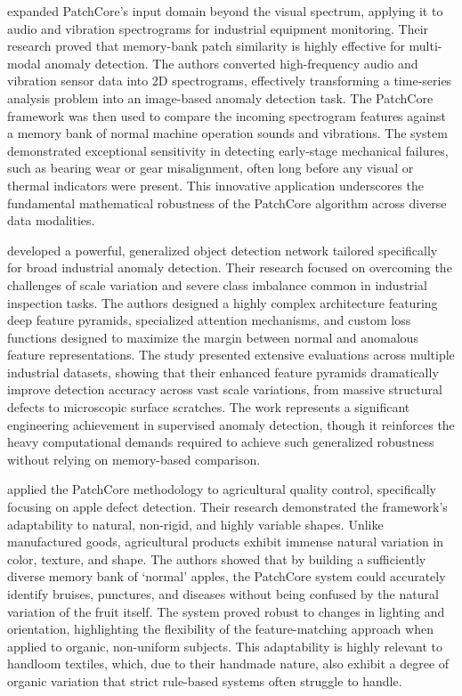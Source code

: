 \documentclass{ieeeaccess}
\begin{document}
\cite{b21} expanded PatchCore's input domain beyond the visual spectrum, applying it to audio and vibration spectrograms for industrial equipment monitoring. Their research proved that memory-bank patch similarity is highly effective for multi-modal anomaly detection. The authors converted high-frequency audio and vibration sensor data into 2D spectrograms, effectively transforming a time-series analysis problem into an image-based anomaly detection task. The PatchCore framework was then used to compare the incoming spectrogram features against a memory bank of normal machine operation sounds and vibrations. The system demonstrated exceptional sensitivity in detecting early-stage mechanical failures, such as bearing wear or gear misalignment, often long before any visual or thermal indicators were present. This innovative application underscores the fundamental mathematical robustness of the PatchCore algorithm across diverse data modalities.

\cite{b22} developed a powerful, generalized object detection network tailored specifically for broad industrial anomaly detection. Their research focused on overcoming the challenges of scale variation and severe class imbalance common in industrial inspection tasks. The authors designed a highly complex architecture featuring deep feature pyramids, specialized attention mechanisms, and custom loss functions designed to maximize the margin between normal and anomalous feature representations. The study presented extensive evaluations across multiple industrial datasets, showing that their enhanced feature pyramids dramatically improve detection accuracy across vast scale variations, from massive structural defects to microscopic surface scratches. The work represents a significant engineering achievement in supervised anomaly detection, though it reinforces the heavy computational demands required to achieve such generalized robustness without relying on memory-based comparison.

\cite{b23} applied the PatchCore methodology to agricultural quality control, specifically focusing on apple defect detection. Their research demonstrated the framework's adaptability to natural, non-rigid, and highly variable shapes. Unlike manufactured goods, agricultural products exhibit immense natural variation in color, texture, and shape. The authors showed that by building a sufficiently diverse memory bank of `normal' apples, the PatchCore system could accurately identify bruises, punctures, and diseases without being confused by the natural variation of the fruit itself. The system proved robust to changes in lighting and orientation, highlighting the flexibility of the feature-matching approach when applied to organic, non-uniform subjects. This adaptability is highly relevant to handloom textiles, which, due to their handmade nature, also exhibit a degree of organic variation that strict rule-based systems often struggle to handle.
\end{document}
